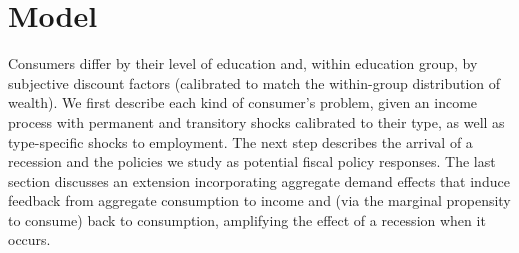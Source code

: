 \documentclass[\econtexRoot/EGMN]{subfiles}
\begin{document}
\notinsubfile{\renewcommand{\econtexRoot}{.}}

\hypertarget{model}{}\par\section{Model}
\notinsubfile{\label{sec:model}}

Consumers differ by their level of education and, within education group, by subjective discount factors (calibrated to match the within-group distribution of wealth). We first describe each kind of consumer's problem, given an income process with permanent and transitory shocks calibrated to their type, as well as type-specific shocks to employment. The next step describes the arrival of a recession and the policies we study as potential fiscal policy responses. The last section discusses an extension incorporating aggregate demand effects that induce feedback from aggregate consumption to income and (via the marginal propensity to consume) back to consumption, amplifying the effect of a recession when it occurs.
\end{document}
